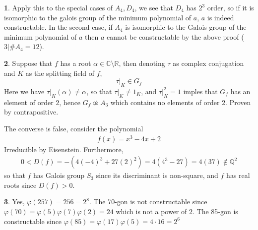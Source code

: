 \documentclass[11pt]{article}
\theoremstyle{definition}
\newtheorem{pb}{}
\begin{document}
\begin{pb}
        Apply this to the special cases of \(A_4, D_4\), we see that \(D_4\) has \(2^3\) order, so if it is isomorphic to the galois group of the minimum polynomial of \(a\), \(a\) is indeed constructable. In the second case, if \(A_4\) is isomorphic to the Galois group of the minimum polynomial of \(a\) then \(a\) cannot be constructable by the above proof (\(3 \vert\# A_4 = 12\)).
    \end{pb}
    \begin{pb}
        Suppose that \(f\) has a root \(\alpha \in \mathbb{C}\setminus \mathbb{R}\), then denoting \(\tau\) as complex conjugation and \(K\) as the splitting field of \(f\), \[\tau\vert_{K} \in G_f\]
        Here we have \(\tau\vert_K (\alpha) \neq \alpha\), so that \(\tau\vert_K \neq 1_K\), and \(\tau\vert_K^2 = 1\) imples that \(G_f\) has an element of order \(2\), hence \(G_f \not \simeq A_3\) which contains no elements of order 2. Proven by contrapositive.

        The converse is false, consider the polynomial
        \begin{align*}
            f(x) = x^3 - 4x + 2
        \end{align*}
        Irreducible by Eisenstein. Furthermore,
        \begin{align*}
            0 < D(f) = -(4(-4)^3 + 27(2)^2) = 4(4^3 - 27) = 4(37) \not \in \mathbb{Q}^2
        \end{align*}
        so that \(f\) has Galois group \(S_3\) since its discriminant is non-square, and \(f\) has real roots since \(D(f) > 0\).
    \end{pb}
    \begin{pb}
        Yes, \(\varphi(257) = 256 = 2^8\).
        The 70-gon is not constructable since \(\varphi(70) = \varphi(5)\varphi(7)\varphi(2) = 24\) which is not a power of \(2\). The 85-gon is constructable since \(\varphi(85) = \varphi(17)\varphi(5) = 4\cdot16 = 2^6\)
    \end{pb}
\end{document}
